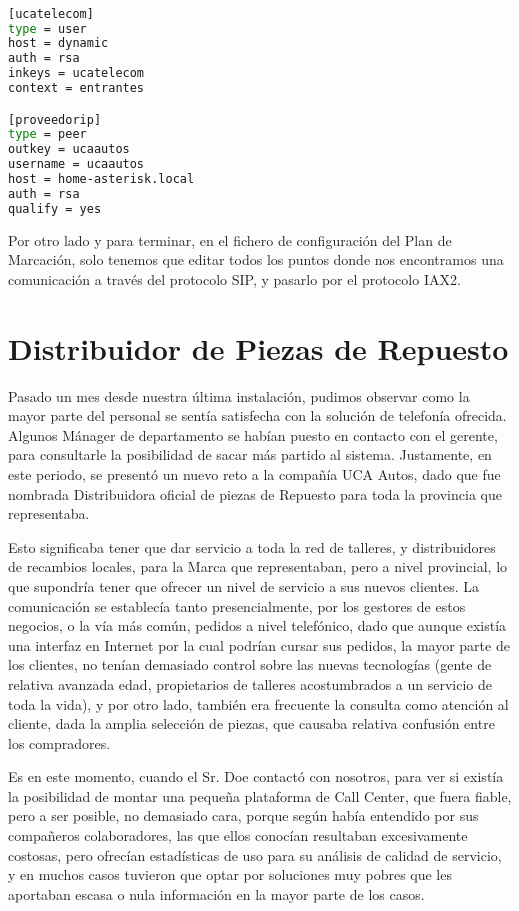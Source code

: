 \begin{lstlisting}[language=bash,title={/etc/asterisk/iax.conf}]

[ucatelecom]
type = user
host = dynamic
auth = rsa
inkeys = ucatelecom
context = entrantes

[proveedorip]
type = peer
outkey = ucaautos
username = ucaautos
host = home-asterisk.local
auth = rsa
qualify = yes

\end{lstlisting}

Por otro lado y para terminar, en el fichero de configuración del Plan de Marcación, solo tenemos que editar todos los puntos donde nos encontramos una comunicación a través del protocolo SIP, y pasarlo por el protocolo IAX2. 

\newpage

\color[rgb]{0,0,1}

\section{Distribuidor de Piezas de Repuesto}

Pasado un mes desde nuestra última instalación, pudimos observar como la mayor parte del personal se sentía satisfecha con la solución de telefonía ofrecida. Algunos Mánager de departamento se habían puesto en contacto con el gerente, para consultarle la posibilidad de sacar más partido al sistema. Justamente, en este periodo, se presentó un nuevo reto a la compañía UCA Autos, dado que fue nombrada Distribuidora oficial de piezas de Repuesto para toda la provincia que representaba.

Esto significaba tener que dar servicio a toda la red de talleres, y distribuidores de recambios locales, para la Marca que representaban, pero a nivel provincial, lo que supondría tener que ofrecer un nivel de servicio a sus nuevos clientes. La comunicación se establecía tanto presencialmente, por los gestores de estos negocios, o la vía más común, pedidos a nivel telefónico, dado que aunque existía una interfaz en Internet por la cual podrían cursar sus pedidos, la mayor parte de los clientes, no tenían demasiado control sobre las nuevas tecnologías (gente de relativa avanzada edad, propietarios de talleres acostumbrados a un servicio de toda la vida), y por otro lado, también era frecuente la consulta como atención al cliente, dada la amplia selección de piezas, que causaba relativa confusión entre los compradores.

Es en este momento, cuando el Sr. Doe contactó con nosotros, para ver si existía la posibilidad de montar una pequeña plataforma de Call Center, que fuera fiable, pero a ser posible, no demasiado cara, porque según había entendido por sus compañeros colaboradores, las que ellos conocían resultaban excesivamente costosas, pero ofrecían estadísticas de uso para su análisis de calidad de servicio, y en muchos casos tuvieron que optar por soluciones muy pobres que les aportaban escasa o nula información en la mayor parte de los casos.

